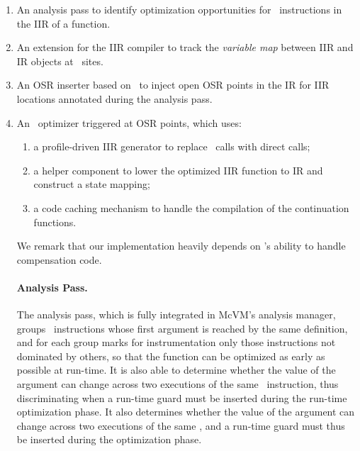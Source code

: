\ifdefined \noauthorea
\begin{enumerate}[noitemsep]
\else
\begin{enumerate}
\fi
\item An analysis pass to identify optimization opportunities for \feval\ instructions in the IIR of a function.
\item An extension for the IIR compiler to track the {\em variable map} between IIR and IR objects at \feval\ sites.
\item An OSR inserter based on \osrkit\ to inject open OSR points in the IR for IIR locations annotated during the analysis pass.
\item An \feval\ optimizer triggered at OSR points, which uses:
\ifdefined \noauthorea
\begin{enumerate}[noitemsep]
\else
\begin{enumerate}
\fi
\item a profile-driven IIR generator to replace \feval\ calls with direct calls;
\item a helper component to lower the optimized IIR function to IR and construct a state mapping;
\item a code caching mechanism to handle the compilation of the continuation functions.
\end{enumerate}
\end{enumerate}

\noindent We remark that our implementation heavily depends on \osrkit's ability to handle compensation code. 

\ifdefined \fullver
\paragraph{Analysis Pass.} The analysis pass, which is fully integrated in McVM's analysis manager, groups \feval\ instructions whose first argument is reached by the same definition, and for each group marks for instrumentation only those instructions not dominated by others, so that the function can be optimized as early as possible at run-time. 
\ifdefined \fullver
It is also able to determine whether the value of the argument can change across two executions of the same \feval\ instruction, thus discriminating when a run-time guard must be inserted during the run-time optimization phase.
\else
It also determines whether the value of the argument can change across two executions of the same \feval, and a run-time guard must thus be inserted during the optimization phase.
\fi


\end{enumerate}
\end{enumerate}
